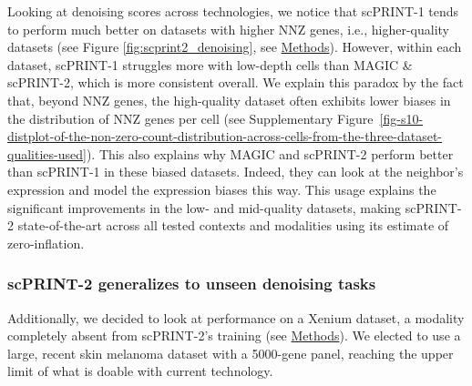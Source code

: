 Looking at denoising scores across technologies, we notice that
scPRINT-1 tends to perform much better on datasets with higher \gls{NNZ}
genes, i.e., higher-quality datasets (see Figure \ref{fig:scprint2_denoising}, see
\hyperref[denoising-task]{Methods}). However, within each dataset,
scPRINT-1 struggles more with low-depth cells than MAGIC \& \gls{scPRINT}-2,
which is more consistent overall. We explain this paradox by the fact
that, beyond \gls{NNZ} genes, the high-quality dataset often exhibits lower
biases in the distribution of \gls{NNZ} genes per cell (see Supplementary Figure~\ref{fig-s10-distplot-of-the-non-zero-count-distribution-across-cells-from-the-three-dataset-qualities-used}).
This also explains why MAGIC and \gls{scPRINT}-2 perform better than scPRINT-1
in these biased datasets. Indeed, they can look at the neighbor's
expression and model the expression biases this way. This usage explains
the significant improvements in the low- and mid-quality datasets,
making \gls{scPRINT}-2 state-of-the-art across all tested contexts and
modalities using its estimate of zero-inflation.

\subsubsection{scPRINT-2 generalizes to unseen denoising
tasks}\label{scprint-2-generalizes-to-unseen-denoising-tasks}

Additionally, we decided to look at performance on a Xenium dataset, a
modality completely absent from \gls{scPRINT}-2's training (see
\hyperref[xenium-analysis]{Methods})\citep{10xgenomicsXeniumPrimeFFPE2024}. We
elected to use a large, recent skin melanoma dataset with a 5000-gene
panel, reaching the upper limit of what is doable with current
technology.

